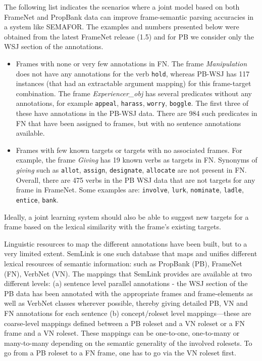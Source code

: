\documentclass[11pt]{article}
\begin{document}
The following list indicates the scenarios where a joint model based on both FrameNet and PropBank data can improve frame-semantic parsing accuracies in a system like SEMAFOR. The examples and numbers presented below were obtained from the latest FrameNet release (1.5) and for PB we consider only the WSJ section of the annotations.
\begin{itemize}
\item Frames with none or very few annotations in FN. The frame \textit{Manipulation} does not have any annotations for the verb \texttt{hold}, whereas PB-WSJ has 117 instances (that had an extractable argument mapping) for this frame-target combination. The frame \textit{Experiencer\_obj} has several predicates without any annotations, for example \texttt{appeal}, \texttt{harass}, \texttt{worry}, \texttt{boggle}. The first three of these have annotations in the PB-WSJ data. There are 984 such predicates in FN that have been assigned to frames, but with no sentence annotations available.
\item Frames with few known targets or targets with no associated frames. For example, the frame \textit{Giving} has 19 known verbs as targets in FN. Synonyms of \textit{giving} such as \texttt{allot}, \texttt{assign}, \texttt{designate}, \texttt{allocate} are not present in FN. Overall, there are 475 verbs in the PB WSJ data that are not targets for any frame in FrameNet. Some examples are: \texttt{involve}, \texttt{lurk}, \texttt{nominate}, \texttt{ladle}, \texttt{entice}, \texttt{bank}.
\end{itemize}
Ideally, a joint learning system should also be able to suggest new targets for a frame based on the lexical similarity with the frame's existing targets.

Linguistic resources to map the different annotations have been built, but to a very limited extent. SemLink \cite{semlink} is one such database that maps and unifies different lexical resources of semantic information: such as PropBank (PB), FrameNet (FN), VerbNet (VN). The mappings that SemLink provides are available at two different levels: (a) sentence level parallel annotations - the WSJ section of the PB data has been annotated with the appropriate frames and frame-elements as well as VerbNet classes wherever possible, thereby giving detailed PB, VN and FN annotations for each sentence (b) concept/roleset level mappings---these are coarse-level mappings defined between a PB roleset and a VN roleset or a FN frame and a VN roleset. These mappings can be one-to-one, one-to-many or many-to-many depending on the semantic generality of the involved rolesets. To go from a PB roleset to a FN frame, one has to go via the VN roleset first.
\end{document}
